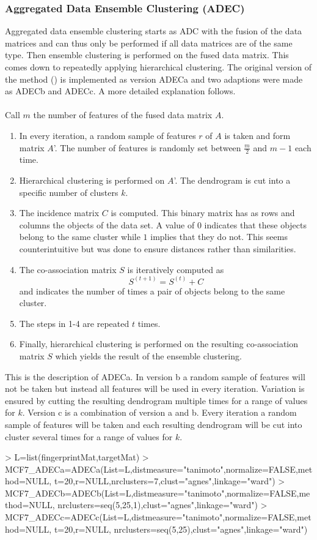 \documentclass[a4paper]{article}
\begin{document}
\subsubsection{Aggregated Data Ensemble Clustering (ADEC)}
Aggregated data ensemble clustering starts as ADC with the
fusion of the data matrices and can thus only be performed if all data matrices
are of the same type. Then ensemble clustering is performed on the fused data
matrix. This comes down to repeatedly applying hierarchical clustering. The
original version of the method (\cite{Fodeh2013}) is implemented as version
ADECa and two adaptions were made as ADECb and ADECc. A more detailed
explanation follows.\\ \\
Call $m$ the number of features of the fused data matrix $A$.
\begin{enumerate}
\item In every iteration, a random sample of features $r$ of $A$ is taken and
form matrix $A$'. The number of features is randomly set between $\frac{m}{2}$
and $m-1$ each time.
\item Hierarchical clustering is performed on $A$'. The dendrogram is cut into a
specific number of clusters $k$.
\item The incidence matrix $C$ is computed. This binary matrix has as rows and
columns the objects of the data set. A value of $0$ indicates that these
objects belong to the same cluster while $1$ implies that they do not. This
seems counterintuitive but was done to ensure distances rather than
similarities.
\item The co-association matrix $S$ is iteratively computed as
$$S^{(t+1)}=S^{(t)}+C$$ and indicates the number of times a pair of objects
belong to the same cluster.
\item The steps in 1-4 are repeated $t$ times.
\item Finally, hierarchical clustering is performed on the resulting
co-association matrix $S$ which yields the result of the ensemble clustering.
\end{enumerate}
\noindent This is the description of ADECa. In version b a random sample of
features will not be taken but instead all features will be used in every
iteration. Variation is ensured by cutting the resulting dendrogram multiple
times for a range of values for $k$. Version c is a combination of version a and
b. Every iteration a random sample of features will be taken and each resulting
dendrogram will be cut into cluster several times for a range of values for $k$.
\begin{Schunk}
\begin{Sinput}
> L=list(fingerprintMat,targetMat)
> MCF7_ADECa=ADECa(List=L,distmeasure="tanimoto",normalize=FALSE,method=NULL,
                  t=20,r=NULL,nrclusters=7,clust="agnes",linkage="ward")
> MCF7_ADECb=ADECb(List=L,distmeasure="tanimoto",normalize=FALSE,method=NULL,
                  nrclusters=seq(5,25,1),clust="agnes",linkage="ward")
> MCF7_ADECc=ADECc(List=L,distmeasure="tanimoto",normalize=FALSE,method=NULL,
                  t=20,r=NULL, nrclusters=seq(5,25),clust="agnes",linkage="ward")
\end{Sinput}
\end{Schunk}
\end{document}
